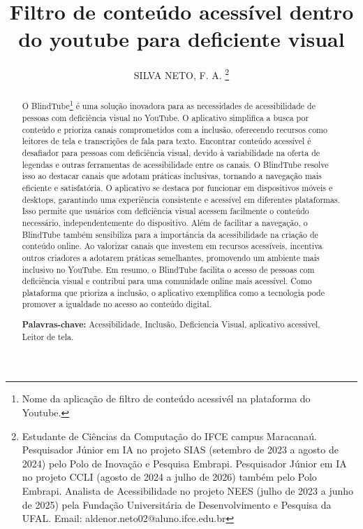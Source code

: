 \documentclass[12pt]{article}
\title{Filtro de conteúdo acessível dentro do youtube para deficiente visual}
\author{SILVA NETO, F. A. \thanks{Estudante de Ciências da Computação do IFCE campus Maracanaú. Pesquisador Júnior em IA no projeto SIAS (setembro de 2023 a agosto de 2024) pelo Polo de Inovação e Pesquisa Embrapi. Pesquisador Júnior em IA no projeto CCLI (agosto de 2024 a julho de 2026) também pelo Polo Embrapi. Analista de Acessibilidade no projeto NEES (julho de 2023 a junho de 2025) pela Fundação Universitária de Desenvolvimento e Pesquisa da UFAL. Email: aldenor.neto02@aluno.ifce.edu.br}}
\date{\vspace{-5ex}}
\begin{document}
\maketitle

\begin{abstract}
\onehalfspacing
O BlindTube\thanks{Nome da aplicação de filtro de conteúdo acessivél na plataforma do Youtube.} é uma solução inovadora para as necessidades de acessibilidade de pessoas com deficiência visual no YouTube. O aplicativo simplifica a busca por conteúdo e prioriza canais comprometidos com a inclusão, oferecendo recursos como leitores de tela e transcrições de fala para texto.
Encontrar conteúdo acessível é desafiador para pessoas com deficiência visual, devido à variabilidade na oferta de legendas e outras ferramentas de acessibilidade entre os canais. O BlindTube resolve isso ao destacar canais que adotam práticas inclusivas, tornando a navegação mais eficiente e satisfatória.
O aplicativo se destaca por funcionar em dispositivos móveis e desktops, garantindo uma experiência consistente e acessível em diferentes plataformas. Isso permite que usuários com deficiência visual acessem facilmente o conteúdo necessário, independentemente do dispositivo.
Além de facilitar a navegação, o BlindTube também sensibiliza para a importância da acessibilidade na criação de conteúdo online. Ao valorizar canais que investem em recursos acessíveis, incentiva outros criadores a adotarem práticas semelhantes, promovendo um ambiente mais inclusivo no YouTube.
Em resumo, o BlindTube facilita o acesso de pessoas com deficiência visual e contribui para uma comunidade online mais acessível. Como plataforma que prioriza a inclusão, o aplicativo exemplifica como a tecnologia pode promover a igualdade no acesso ao conteúdo digital.
 
\textbf{Palavras-chave:} Acessibilidade, Inclusão, Deficiencia Visual, aplicativo acessivel, Leitor de tela.
\end{abstract}
\end{document}
